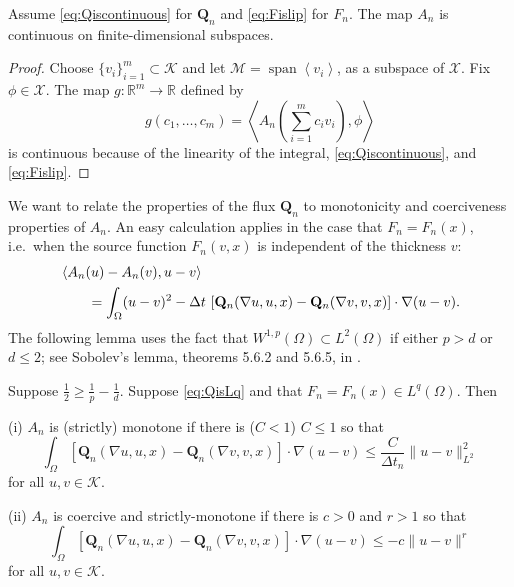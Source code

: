 \documentclass[final,leqno,onefignum,onetabnum]{siamltex1213bueler}
\newcommand\bQ{\mathbf{Q}}
\renewcommand{\grad}{\nabla}
\newcommand{\ip}[2]{\ensuremath{\left<#1,#2\right>}}
\newcommand\RR{\mathbb{R}}
\begin{document}
\medskip
\begin{lemma}  \label{lem:continuous}  Assume \eqref{eq:Qiscontinuous} for $\bQ_n$ and \eqref{eq:Fislip} for $F_n$.  The map $A_n$ is continuous on finite-dimensional subspaces.
\end{lemma}

\begin{proof} Choose $\{v_i\}_{i=1}^m \subset \mathcal{K}$ and let $\mathcal{M}=\operatorname{span}\left<v_i\right>$, as a subspace of $\mathcal{X}$.  Fix $\phi\in\mathcal{X}$.  The map $g:\RR^m \to \RR$ defined by
\begin{equation}
  g(c_1,\dots,c_m) = \ip{A_n\left(\sum_{i=1}^m c_i v_i\right)}{\phi}
\end{equation}
is continuous because of the linearity of the integral, \eqref{eq:Qiscontinuous}, and \eqref{eq:Fislip}.
\end{proof}

\medskip
We want to relate the properties of the flux $\bQ_n$ to monotonicity and coerciveness properties of $A_n$.  An easy calculation applies in the case that $F_n=F_n(x)$, i.e.~when the source function $F_n(v,x)$ is independent of the thickness $v$:
\begin{align}
   &\ip{A_n(u) - A_n(v)}{u-v}  \label{eq:AtoQcalculation} \\
   &\qquad = \int_\Omega (u-v)^2 - \Delta t\, \left[\bQ_n(\grad u,u,x) - \bQ_n(\grad v,v,x)\right] \cdot \grad(u-v).  \notag
\end{align}
The following lemma uses the fact that $W^{1,p}(\Omega) \subset L^2(\Omega)$ if either $p>d$ or $d\le 2$; see Sobolev's lemma, theorems 5.6.2 and 5.6.5, in \cite{Evans1998}.

\begin{lemma}  \label{lem:monotonecoercive}  Suppose $\frac{1}{2} \ge \frac{1}{p} - \frac{1}{d}$.  Suppose \eqref{eq:QisLq} and that $F_n=F_n(x) \in L^q(\Omega)$.  Then

(i)  $A_n$ is (strictly) monotone if there is ($C<1$) $C\le 1$ so that
\begin{equation}
\int_\Omega \left[\bQ_n(\grad u,u,x) - \bQ_n(\grad v,v,x)\right] \cdot \grad(u-v) \le \frac{C}{\Delta t_n} \|u-v\|_{L^2}^2 \label{eq:Qnmonotone}
\end{equation}
for all $u,v \in \mathcal{K}$.

(ii)  $A_n$ is coercive and strictly-monotone if there is $c>0$ and $r>1$ so that
\begin{equation}
\int_\Omega \left[\bQ_n(\grad u,u,x) - \bQ_n(\grad v,v,x)\right] \cdot \grad(u-v) \le - c \|u-v\|^r \label{eq:Qncoercive}
\end{equation}
for all $u,v \in \mathcal{K}$.
\end{lemma}
\end{document}
